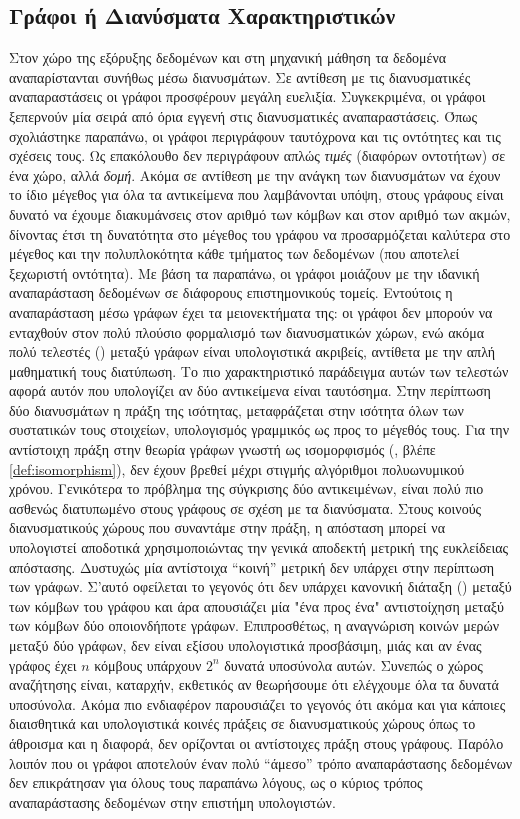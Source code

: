 \subsection{Γράφοι ή Διανύσματα Χαρακτηριστικών}
Στον χώρο της εξόρυξης δεδομένων και στη μηχανική μάθηση τα δεδομένα αναπαρίστανται συνήθως μέσω διανυσμάτων.
Σε αντίθεση με τις διανυσματικές αναπαραστάσεις οι γράφοι προσφέρουν μεγάλη ευελιξία.
Συγκεκριμένα, οι γράφοι ξεπερνούν μία σειρά από όρια εγγενή στις διανυσματικές αναπαραστάσεις.
Όπως σχολιάστηκε παραπάνω, οι γράφοι περιγράφουν ταυτόχρονα και τις οντότητες και τις σχέσεις τους.
Ως επακόλουθο δεν περιγράφουν απλώς \textit{τιμές} (διαφόρων οντοτήτων) σε ένα χώρο, αλλά \textit{δομή}.
Ακόμα σε αντίθεση με την ανάγκη των διανυσμάτων να έχουν το ίδιο μέγεθος για όλα τα αντικείμενα που λαμβάνονται υπόψη, στους γράφους είναι δυνατό να έχουμε διακυμάνσεις στον αριθμό των κόμβων και στον αριθμό των ακμών, δίνοντας έτσι τη δυνατότητα στο μέγεθος του γράφου να προσαρμόζεται καλύτερα στο μέγεθος και την πολυπλοκότητα κάθε τμήματος των δεδομένων (που αποτελεί ξεχωριστή οντότητα).
Με βάση τα παραπάνω, οι γράφοι μοιάζουν με την ιδανική αναπαράσταση δεδομένων σε διάφορους επιστημονικούς τομείς.
Εντούτοις η αναπαράσταση μέσω γράφων έχει τα μειονεκτήματα της: οι γράφοι δεν μπορούν να ενταχθούν στον πολύ πλούσιο φορμαλισμό των διανυσματικών χώρων, ενώ ακόμα πολύ τελεστές () μεταξύ γράφων είναι υπολογιστικά ακριβείς, αντίθετα με την απλή μαθηματική τους διατύπωση.
Το πιο χαρακτηριστικό παράδειγμα αυτών των τελεστών αφορά αυτόν που υπολογίζει αν δύο αντικείμενα είναι ταυτόσημα.
Στην περίπτωση δύο διανυσμάτων η πράξη της ισότητας, μεταφράζεται στην ισότητα όλων των συστατικών τους στοιχείων, υπολογισμός γραμμικός ως προς το μέγεθός τους.
Για την αντίστοιχη πράξη στην θεωρία γράφων γνωστή ως ισομορφισμός (, βλέπε \ref{def:isomorphism}), δεν έχουν βρεθεί μέχρι στιγμής αλγόριθμοι πολυωνυμικού χρόνου.
Γενικότερα το πρόβλημα της σύγκρισης δύο αντικειμένων, είναι πολύ πιο ασθενώς διατυπωμένο στους γράφους σε σχέση με τα διανύσματα.
Στους κοινούς διανυσματικούς χώρους που συναντάμε στην πράξη, η απόσταση μπορεί να υπολογιστεί αποδοτικά χρησιμοποιώντας την γενικά αποδεκτή μετρική της ευκλείδειας απόστασης.
Δυστυχώς μία αντίστοιχα ``κοινή'' μετρική δεν υπάρχει στην περίπτωση των γράφων.
Σ'αυτό οφείλεται το γεγονός ότι δεν υπάρχει κανονική διάταξη () μεταξύ των κόμβων του γράφου και άρα απουσιάζει μία "ένα προς ένα" αντιστοίχηση μεταξύ των κόμβων δύο οποιονδήποτε γράφων.
Επιπροσθέτως, η αναγνώριση κοινών μερών μεταξύ δύο γράφων, δεν είναι εξίσου υπολογιστικά προσβάσιμη, μιάς και αν ένας γράφος έχει $n$ κόμβους υπάρχουν $2^{n}$ δυνατά υποσύνολα αυτών.
Συνεπώς ο χώρος αναζήτησης είναι, καταρχήν, εκθετικός αν θεωρήσουμε ότι ελέγχουμε όλα τα δυνατά υποσύνολα.
Ακόμα πιο ενδιαφέρον παρουσιάζει το γεγονός ότι ακόμα και για κάποιες διαισθητικά και υπολογιστικά κοινές πράξεις σε διανυσματικούς χώρους όπως το άθροισμα και η διαφορά, δεν ορίζονται οι αντίστοιχες πράξη στους γράφους.
Παρόλο λοιπόν που οι γράφοι αποτελούν έναν πολύ ``άμεσο'' τρόπο αναπαράστασης δεδομένων δεν επικράτησαν για όλους τους παραπάνω λόγους, ως ο κύριος τρόπος αναπαράστασης δεδομένων στην επιστήμη υπολογιστών.
